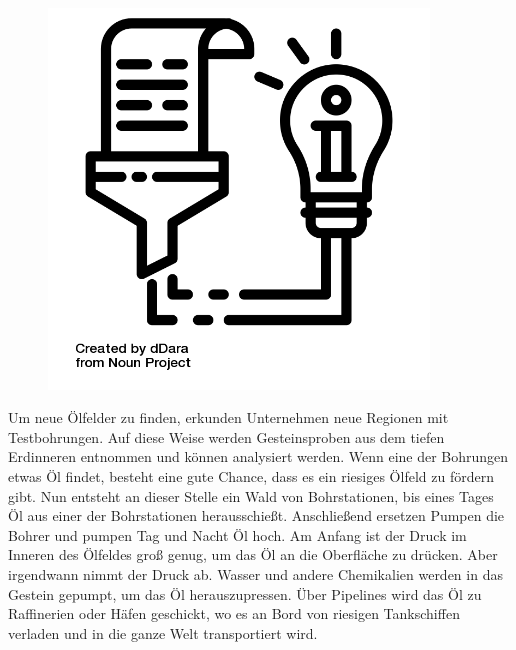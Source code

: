 \documentclass{scrartcl}  %
\begin{document}
				
			
		\begin{tcolorbox}[enhanced,
							colback=white,
							colframe=darkgray,
							fonttitle=\sffamily\bfseries\large, 
							title=Erdölförderung,
							attach boxed title to top left={xshift=3.2mm,yshift=-0.50mm},
							boxed title style={skin=enhancedfirst jigsaw,height=0.7cm,size=small,arc=1mm,bottom=-1mm,colframe=darkgray,height=0.75cm},
							colbacktitle=darkgray,
							drop lifted shadow]
			\begin{figure}  
				\centering
				\vspace{-14pt}  %
				\includegraphics[width=0.9\textwidth]{../symbols/symbol_tex_content}
			\end{figure}
	

			\noindent Um neue Ölfelder zu finden, erkunden Unternehmen neue Regionen mit Testbohrungen. Auf diese Weise werden Gesteinsproben aus dem tiefen Erdinneren entnommen und können analysiert werden. Wenn eine der Bohrungen etwas Öl findet, besteht eine gute Chance, dass es ein riesiges Ölfeld zu fördern gibt. Nun entsteht an dieser Stelle ein Wald von Bohrstationen, bis eines Tages Öl aus einer der Bohrstationen herausschießt. Anschließend ersetzen Pumpen die Bohrer und pumpen Tag und Nacht Öl hoch. Am Anfang ist der Druck im Inneren des Ölfeldes groß genug, um das Öl an die Oberfläche zu drücken. Aber irgendwann nimmt der Druck ab. Wasser und andere Chemikalien werden in das Gestein gepumpt, um das Öl herauszupressen. Über Pipelines wird das Öl zu Raffinerien oder Häfen geschickt, wo es an Bord von riesigen Tankschiffen verladen und in die ganze Welt transportiert wird.
	

		\end{tcolorbox}
\end{document}

